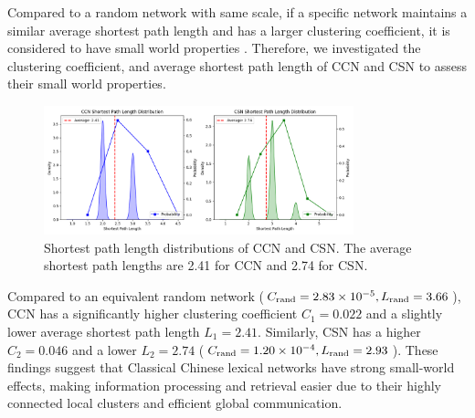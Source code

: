 \documentclass[11pt]{article}
\begin{document}
Compared to a random network with same scale, if a specific network maintains a similar average shortest path length and has a larger clustering coefficient, it is considered to have small world properties \cite{watts1998collective}. Therefore, we investigated the clustering coefficient, and average shortest path length of CCN and CSN to assess their small world properties.
\begin{figure}[htbp]
    \centering
    \includegraphics[width=0.8\textwidth]{../analysis/shortest path/shortest path.png}
    \caption{Shortest path length distributions of CCN and CSN. The average shortest path lengths are 2.41 for CCN and 2.74 for CSN.}
    \label{fig:shortest_path}
    \end{figure}
    Compared to an equivalent random network ($C_{\rm rand}=2.83 \times 10^{-5}, L_{\rm rand}=3.66$), CCN has a significantly higher clustering coefficient $C_1=0.022$ and a slightly lower average shortest path length $L_1=2.41$. Similarly, CSN has a higher $C_2=0.046$ and a lower $L_2=2.74$ ($C_{\rm rand}=1.20 \times 10^{-4}, L_{\rm rand}=2.93$). These findings suggest that Classical Chinese lexical networks have strong small-world effects, making information processing and retrieval easier due to their highly connected local clusters and efficient global communication.
\end{document}
